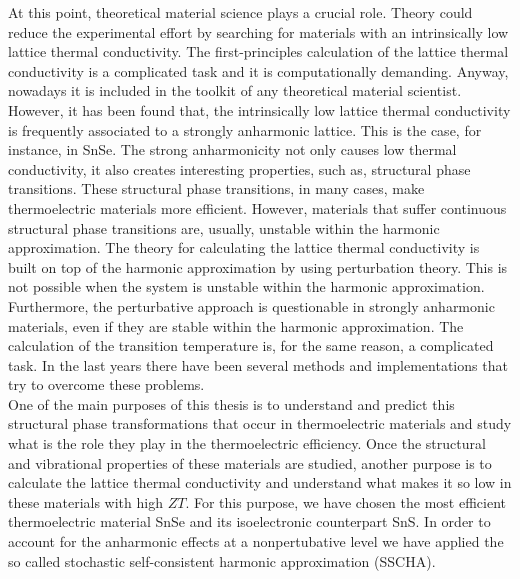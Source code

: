 At this point, theoretical material science plays a crucial role. Theory could reduce the experimental effort by 
searching for materials with an intrinsically low lattice thermal conductivity. The first-principles calculation of 
the lattice thermal conductivity is a complicated task and it is computationally demanding\cite{broido2007intrinsic}. 
Anyway, nowadays it is included in the toolkit\cite{giannozzi2009quantum} of any theoretical material scientist. 
However, it has been found that, the intrinsically low lattice thermal conductivity is frequently associated to 
a strongly anharmonic lattice\cite{zhao2014ultralow,ribeiro2018strong}. This is the case, for instance, in SnSe. The 
strong anharmonicity not only causes low thermal conductivity, it also creates interesting properties, such as, 
structural phase transitions. These structural phase transitions, in many cases, make thermoelectric materials 
more efficient\cite{liu2013ultrahigh}. However, materials that suffer continuous structural phase transitions are, 
usually, unstable within the harmonic approximation. The theory for calculating the lattice thermal conductivity is
built on top of the harmonic approximation by using perturbation theory\cite{paulatto2013anharmonic}. This is not 
possible when the system is unstable within the harmonic approximation. Furthermore, the perturbative approach is 
questionable in strongly anharmonic materials, even if they are stable within the harmonic approximation.
The calculation of the transition temperature is, for the same reason, a complicated task. In the last years there 
have been several 
methods and implementations\cite{hellman2013temperature,ljungberg2013temperature,magduau2013identification} that try 
to overcome these problems. \\

One of the main purposes of this thesis is to understand and predict this structural phase transformations that occur 
in thermoelectric materials and study what is the role they play in the thermoelectric efficiency. Once the 
structural and vibrational properties of these materials are studied, another purpose is to calculate the lattice 
thermal conductivity and understand what makes it so low in these materials with high $ZT$. For this purpose, we have 
chosen the most efficient thermoelectric material SnSe and its isoelectronic counterpart SnS. In order to account 
for the anharmonic effects at a nonpertubative level we have applied the so called stochastic self-consistent 
harmonic approximation\cite{errea2013first,errea2014anharmonic,bianco2017second,monacelli2018pressure} (SSCHA). \\

